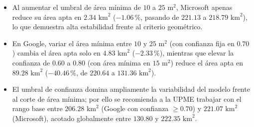 \begin{itemize}
  \item Al aumentar el umbral de área mínima de $10$ a $25\text{ m}^2$, Microsoft apenas reduce su área apta en $2.34\text{ km}^2$ ($-1.06\,\%$, pasando de $221.13$ a $218.79\text{ km}^2$), lo que demuestra alta estabilidad frente al criterio geométrico.
  \item En Google, variar el área mínima entre $10$ y $25\text{ m}^2$ (con confianza fija en $0.70$) cambia el área apta solo en $4.83\text{ km}^2$ ($-2.33\,\%$), mientras que elevar la confianza de $0.60$ a $0.80$ (con área mínima en $15\text{ m}^2$) reduce el área apta en $89.28\text{ km}^2$ ($-40.46\,\%$, de $220.64$ a $131.36\text{ km}^2$).
  \item El umbral de confianza domina ampliamente la variabilidad del modelo frente al corte de área mínima; por ello se recomienda a la UPME trabajar con el rango base entre $206.28\text{ km}^2$ (Google con confianza $\ge 0.70$) y $221.07\text{ km}^2$ (Microsoft), acotado globalmente entre $130.80$ y $222.35\text{ km}^2$.
\end{itemize}
